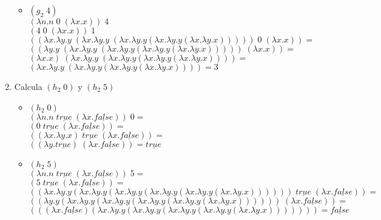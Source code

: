 \documentclass[11pt, a4paper]{report}
\begin{document}
\begin{enumerate}[label=\alph*)]
\begin{itemize}
    \item $(g_{2}\; 4)$\\
    $(\lambda n. n\; 0\; (\lambda x. x))\;4$\\
    $(4\; 0\; (\lambda x. x))\;1$\\
    $((\lambda x. \lambda y. y\; (\lambda x. \lambda y. y\; (\lambda x. \lambda y. y 
    (\lambda x. \lambda y. y (\lambda x. \lambda y. x)))))
    \;0\;(\lambda x. x))=$\\
    $((\lambda y. y\; (\lambda x. \lambda y. y\; (\lambda x. \lambda y. y 
    (\lambda x. \lambda y. y (\lambda x. \lambda y. x)))))
    \;(\lambda x. x))=$\\
    $(\lambda x. x)\;(\lambda x. \lambda y. y\; (\lambda x. \lambda y. y 
    (\lambda x. \lambda y. y (\lambda x. \lambda y. x))))=$\\
    $(\lambda x. \lambda y. y\; (\lambda x. \lambda y. y 
    (\lambda x. \lambda y. y (\lambda x. \lambda y. x))))= 3$\\
    
    
    \end{itemize}
	\item Calcula $(h_{2} \;0)$ y $(h_{2}\;5)$
    \begin{itemize}
    \item $(h_{2} \;0)$ \\
    $(\lambda n. n \; \underline{true} \; (\lambda x. \underline{false}))\;0 =$\\
    $(0 \; \underline{true} \; (\lambda x. \underline{false})) =$\\
    $((\lambda x. \lambda y. x) \; \underline{true} \; (\lambda x. \underline{false})) =$\\
    $((\lambda y. \underline{true}) \; (\lambda x. \underline{false})) = 
    \underline{true}$\\
    
    \item $(h_{2} \;5)$ \\
    $(\lambda n. n \; \underline{true} \; (\lambda x. \underline{false}))\;5 =$\\
    $(5\; \underline{true} \; (\lambda x. \underline{false}))=$\\
    $((\lambda x.\lambda y. y (\lambda x.\lambda y. y (\lambda x. \lambda y. y 
    (\lambda x.\lambda y. y (\lambda x. \lambda y. y (\lambda x. \lambda y. x))))))\; 
    \underline{true} \; (\lambda x. \underline{false}))=$\\
    $((\lambda y. y (\lambda x.\lambda y. y (\lambda x. \lambda y. y 
    (\lambda x.\lambda y. y (\lambda x. \lambda y. y (\lambda x. \lambda y. x))))))
    \; (\lambda x. \underline{false}))=$\\
    $(((\lambda x. \underline{false})(\lambda x.\lambda y. y (\lambda x. \lambda y. y 
    (\lambda x.\lambda y. y (\lambda x. \lambda y. y (\lambda x. \lambda y. x)))))))= 	
    \underline{false}$\\
    

\end{itemize}
\end{enumerate}
\end{document}
